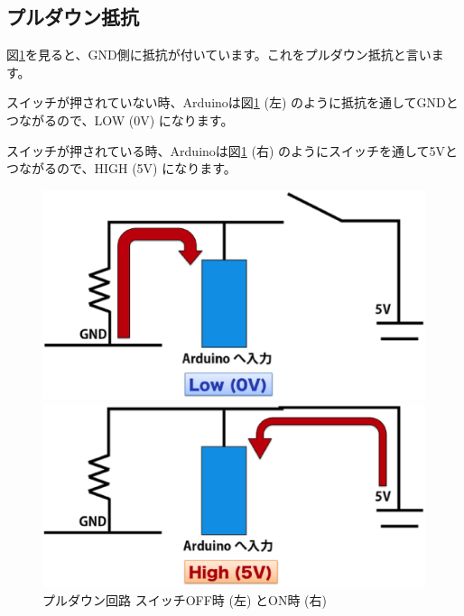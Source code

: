 \documentclass[11pt,a4paper]{jarticle}
\begin{document}
\subsection{プルダウン抵抗}
 図\ref{fig:pulldown}を見ると、GND側に抵抗が付いています。これをプルダウン抵抗と言います。
 
 スイッチが押されていない時、Arduinoは図\ref{fig:pulldown} (左) のように抵抗を通してGNDとつながるので、LOW (0V) になります。
 
 スイッチが押されている時、Arduinoは図\ref{fig:pulldown} (右) のようにスイッチを通して5Vとつながるので、HIGH (5V) になります。

 \begin{figure}[htbp]
  \begin{minipage}{0.5\columnwidth}
   \centering
   \includegraphics[width=0.8\columnwidth]{img/pulldown_off.eps}
  \end{minipage}
  \begin{minipage}{0.5\columnwidth}
   \includegraphics[width=0.8\columnwidth]{img/pulldown_on.eps}
  \end{minipage}
  \caption{プルダウン回路 スイッチOFF時 (左) とON時 (右)  }
  \label{fig:pulldown}
\end{figure}

\end{document}
